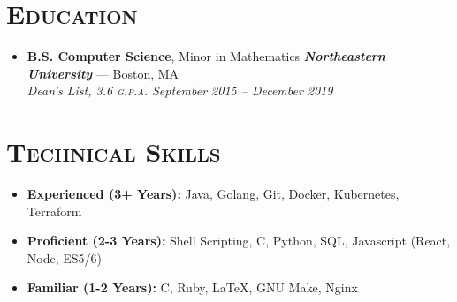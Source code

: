 \documentclass{article}
\begin{document}
\section*{\textsc{Education}}
\begin{itemize}[label={},leftmargin=*]
  \item \textbf{B.S. Computer Science}, Minor in Mathematics \hfill \textit{\textbf{Northeastern University}} --- Boston, MA \\
  \em{Dean's List}, 3.6 \textsc{g.p.a.}  \hfill \em{\textit{September 2015 -- December 2019}}
\end{itemize}

\section*{\textsc{Technical Skills}}
\begin{itemize}[label={},leftmargin=*]
  \item \textbf{Experienced (3+ Years):} Java, Golang, Git, Docker, Kubernetes, Terraform
  \item \textbf{Proficient (2-3 Years):} Shell Scripting, C, Python, SQL, Javascript (React, Node, ES5/6)
  \item \textbf{Familiar (1-2 Years):} C, Ruby, LaTeX, GNU Make, Nginx
\end{itemize}
\end{document}
